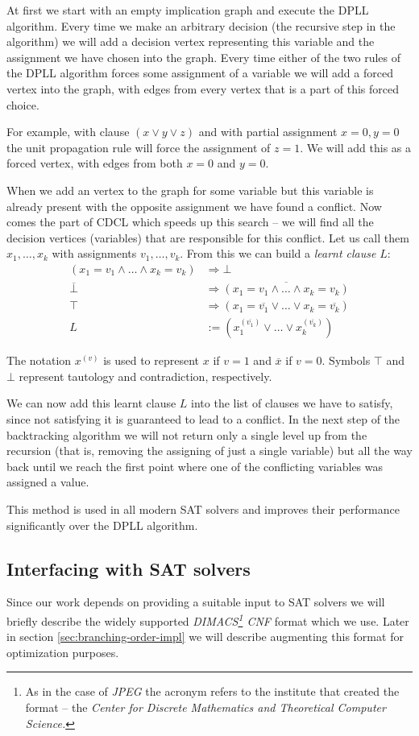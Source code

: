 At first we start with an empty implication graph and execute the DPLL algorithm.
Every time we make an arbitrary decision (the recursive step in the algorithm) we will add a decision vertex representing this variable and the assignment we have chosen into the graph.
Every time either of the two rules of the DPLL algorithm forces some assignment of a variable we will add a forced vertex into the graph, with edges from every vertex that is a part of this forced choice.

For example, with clause $(x \lor y \lor z)$ and with partial assignment $x=0, y=0$ the unit propagation rule will force the assignment of $z=1$.
We will add this as a forced vertex, with edges from both $x=0$ and $y=0$.

When we add an vertex to the graph for some variable but this variable is already present with the opposite assignment we have found a conflict.
Now comes the part of CDCL which speeds up this search -- we will find all the decision vertices (variables) that are responsible for this conflict.
Let us call them $x_1, \dots, x_k$ with assignments $v_1, \dots, v_k$.
From this we can build a \emph{learnt clause} $L$:
\begin{align*}
(x_1 = v_1 \land \dots \land x_k = v_k) &\Rightarrow \bot \\
\overline{\bot} &\Rightarrow \overline{(x_1 = v_1 \land \dots \land x_k = v_k)} \\
\top &\Rightarrow (x_1 = \overline{v_1} \lor \dots \lor x_k = \overline{v_k}) \\
L &:= (x_1^{(\overline{v_1})} \lor \dots \lor x_k^{(\overline{v_k})})
\end{align*}

The notation $x^{(v)}$ is used to represent $x$ if $v=1$ and $\overline{x}$ if $v=0$. Symbols $\top$ and $\bot$ represent tautology and contradiction, respectively.

We can now add this learnt clause $L$ into the list of clauses we have to satisfy, since not satisfying it is guaranteed to lead to a conflict.
In the next step of the backtracking algorithm we will not return only a single level up from the recursion (that is, removing the assigning of just a single variable) but all the way back until we reach the first point where one of the conflicting variables was assigned a value.

This method is used in all modern SAT solvers and improves their performance significantly over the DPLL algorithm.

\subsection{Interfacing with SAT solvers}
\label{sec:dimacs}
Since our work depends on providing a suitable input to SAT solvers we will briefly describe the widely supported \emph{DIMACS\footnote{As in the case of \emph{JPEG} the acronym refers to the institute that created the format -- the \emph{Center for Discrete Mathematics and Theoretical Computer Science.}} CNF} format which we use.
Later in section \ref{sec:branching-order-impl} we will describe augmenting this format for optimization purposes.

